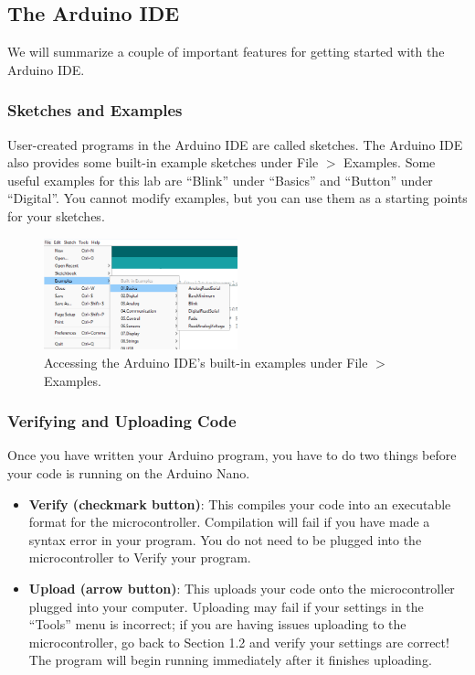 \documentclass{article}
\begin{document}
\clearpage

\subsection{The Arduino IDE}

We will summarize a couple of important features for getting started with the Arduino IDE.

\subsubsection{Sketches and Examples}

User-created programs in the Arduino IDE are called sketches. The Arduino IDE also provides some built-in example sketches under File $>$ Examples. Some useful examples for this lab are ``Blink'' under ``Basics'' and ``Button'' under ``Digital''. You cannot modify examples, but you can use them as a starting points for your sketches.

\begin{figure}[ht]
    \centering
    \includegraphics[width = 0.5\textwidth]{images/examples.png}
    \cprotect\caption{Accessing the Arduino IDE's built-in examples under File $>$ Examples.}
\end{figure}

\subsubsection{Verifying and Uploading Code}

Once you have written your Arduino program, you have to do two things before your code is running on the Arduino Nano.

\begin{itemize}
    \item {\bf Verify (checkmark button)}: This compiles your code into an executable format for the microcontroller. Compilation will fail if you have made a syntax error in your program. You do not need to be plugged into the microcontroller to Verify your program.
    \item {\bf Upload (arrow button)}: This uploads your code onto the microcontroller plugged into your computer. Uploading may fail if your settings in the ``Tools'' menu is incorrect; if you are having issues uploading to the microcontroller, go back to Section 1.2 and verify your settings are correct! The program will begin running immediately after it finishes uploading.
\end{itemize}
\end{document}
